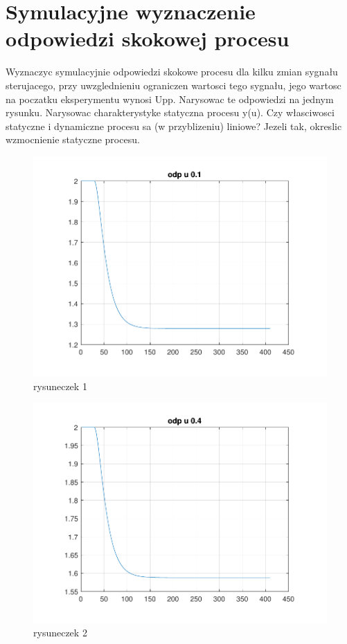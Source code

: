 \section{Symulacyjne wyznaczenie odpowiedzi skokowej procesu}
Wyznaczyc symulacyjnie odpowiedzi skokowe procesu dla kilku zmian sygnału sterujacego,
przy uwzglednieniu ograniczen wartosci tego sygnału, jego wartosc na poczatku
eksperymentu wynosi Upp. Narysowac te odpowiedzi na jednym rysunku. Narysowac
charakterystyke statyczna procesu y(u). Czy własciwosci statyczne i dynamiczne procesu
sa (w przyblizeniu) liniowe? Jezeli tak, okreslic wzmocnienie statyczne procesu.

\begin{figure}[H]
    \centering
    \includegraphics[scale=0.8]{../projekt/zad2/img/odp_u_0_1.pdf}
    \caption{rysuneczek 1}
\end{figure}
\begin{figure}[H]
    \centering
    \includegraphics[scale=0.8]{../projekt/zad2/img/odp_u_0_4.pdf}
    \caption{rysuneczek 2}
\end{figure}

